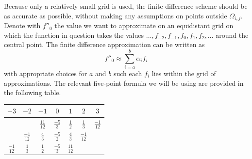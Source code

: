 Because only a relatively small grid is used, the finite difference scheme should be as accurate as possible, without making any assumptions on points outside $\Omega_{i,j}$. Denote with $f''_0$ the value we want to approximate on an equidistant grid on which the function in question takes the values $\dots, f_{-2}, f_{-1}, f_{0}, f_{1}, f_{2}, \dots$ around the central point. The finite difference approximation can be written as
$$
    f''_0 \approx \sum_{i = a}^{b} \alpha_i f_i
$$
with appropriate choices for $a$ and $b$ such each $f_i$ lies within the grid of approximations. The relevant five-point formula we will be using are provided in the following table.

\begin{center}
    \begin{tabular}{@{}ccc|c|ccc@{}}
        $-3$                               & $-2$            & $-1$            & $0$            & $1$             & $2$             & $3$             \\ \hline
        \rule{0pt}{3ex}                    &                 & $\frac{11}{12}$ & $\frac{-5}{3}$ & $\frac{1}{2}$   & $\frac{1}{3}$   & $\frac{-1}{12}$ \\
        \rule{0pt}{3ex}                    & $\frac{-1}{12}$ & $\frac{4}{3}$   & $\frac{-5}{2}$ & $\frac{4}{3}$   & $\frac{-1}{12}$ &                 \\
        \rule{0pt}{3ex}    $\frac{-1}{12}$ & $\frac{1}{3}$   & $\frac{1}{2}$   & $\frac{-5}{3}$ & $\frac{11}{12}$ &                 &
    \end{tabular}
\end{center}

